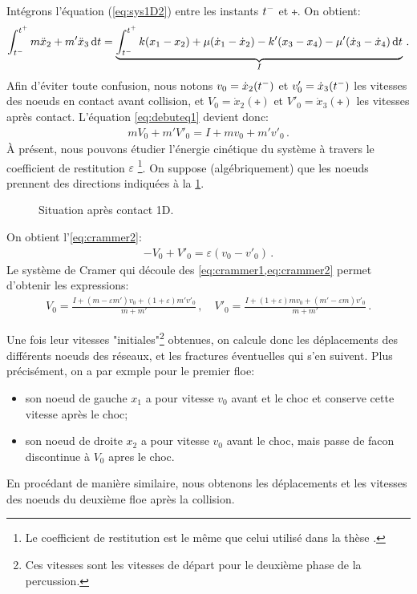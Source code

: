 \noindent Intégrons l'équation (\ref{eq:sys1D2}) entre les instants $t^{-}$ et $\tplus$. On obtient:
\begin{align}    \label{eq:debuteq1}
    \int_{\tmoins}^{\tplus} m\ddot x_2 + m'\ddot x_3 \diff t = \underbrace{\int_{\tmoins}^{\tplus} k(x_1 - x_2) + \mu (\dot x_1 - \dot x_2) - k'(x_3 - x_4) - \mu'(\dot x_3 - \dot x_4) \diff t}_{I} \,.
\end{align}
Afin d'éviter toute confusion, nous notons $v_0 = \dot{x}_2(t^{-})$ et $v'_0 = \dot{x}_3(t^{-})$ les vitesses des noeuds en contact avant collision, et $V_0 = \dot{x}_2(\tplus)$ et $V'_0 = \dot{x}_3(\tplus)$ les vitesses après contact. L'équation \cref{eq:debuteq1} devient donc:
\begin{align} \label{eq:crammer1}
    mV_0 + m'V'_0 = I + mv_0 + m'v'_0 \,.
\end{align}
À présent, nous pouvons étudier l'énergie cinétique du système à travers le coefficient de restitution $\varepsilon$ \footnote{Le coefficient de restitution est le même que celui utilisé dans la thèse \parencite{rabatel2015thesis}.}. On suppose (algébriquement) que les noeuds prennent des directions indiquées à la \cref{fig:contact1dapres}. 
\begin{figure}[!h]
    \centering
    \caption{Situation après contact 1D.}
    \label{fig:contact1dapres}
\end{figure}

\noindent On obtient l'\cref{eq:crammer2}:
\begin{align} \label{eq:crammer2}
    - V_0 + V'_0 = \varepsilon (v_0 - v'_0) \,.
\end{align}
Le système de Cramer qui découle des \cref{eq:crammer1,eq:crammer2} permet d'obtenir les expressions:
\begin{align} \label{eq:vitessesapres1D}
    V_0 = \frac{I + (m-\varepsilon m')v_0 + (1+\varepsilon)m'v'_0}{m+m'} \,, \quad V'_0 = \frac{I + (1+\varepsilon)mv_0 + (m'-\varepsilon m)v'_0}{m+m'}\,.
\end{align}


Une fois leur vitesses "initiales"\footnote{Ces vitesses sont les vitesses de départ pour le deuxième phase de la percussion.} obtenues, on calcule donc les déplacements des différents noeuds des réseaux, et les fractures éventuelles qui s'en suivent. Plus précisément, on a par exmple pour le premier floe:
\begin{itemize}
    \item son noeud de gauche $x_1$ a pour vitesse $v_0$ avant et le choc et conserve cette vitesse après le choc;
    \item son noeud de droite $x_2$ a pour vitesse $v_0$ avant le choc, mais passe de facon discontinue à $V_0$ apres le choc.
\end{itemize}
En procédant de manière similaire, nous obtenons les déplacements et les vitesses des noeuds du deuxième floe après la collision.

